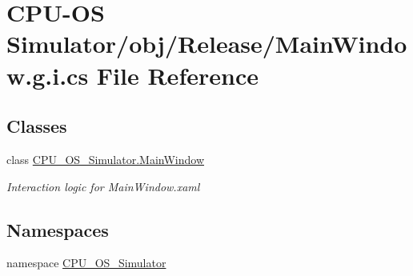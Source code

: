 \hypertarget{_c_p_u-_o_s_01_simulator_2obj_2_release_2_main_window_8g_8i_8cs}{}\section{C\+P\+U-\/\+O\+S Simulator/obj/\+Release/\+Main\+Window.g.\+i.\+cs File Reference}
\label{_c_p_u-_o_s_01_simulator_2obj_2_release_2_main_window_8g_8i_8cs}
\subsection*{Classes}
\begin{DoxyCompactItemize}
\item 
class \hyperlink{class_c_p_u___o_s___simulator_1_1_main_window}{C\+P\+U\+\_\+\+O\+S\+\_\+\+Simulator.\+Main\+Window}
\begin{DoxyCompactList}\small\item\em Interaction logic for Main\+Window.\+xaml \end{DoxyCompactList}\end{DoxyCompactItemize}
\subsection*{Namespaces}
\begin{DoxyCompactItemize}
\item 
namespace \hyperlink{namespace_c_p_u___o_s___simulator}{C\+P\+U\+\_\+\+O\+S\+\_\+\+Simulator}
\end{DoxyCompactItemize}
